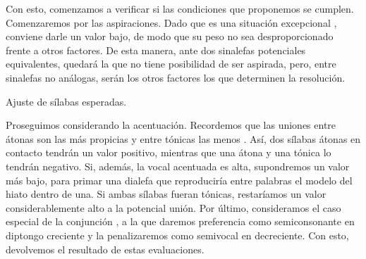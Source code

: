 Con esto, comenzamos a verificar si las condiciones que proponemos se cumplen. Comenzaremos por las aspiraciones. Dado que es una situación excepcional \parencite[50]{quilis2013}, conviene darle un valor bajo, de modo que su peso no sea desproporcionado frente a otros factores. De esta manera, ante dos sinalefas potenciales equivalentes, quedará la que no tiene posibilidad de ser aspirada, pero, entre sinalefas no análogas, serán los otros factores los que determinen la resolución.

\begin{algorithm}[!ht]
	\caption{Ajuste de sílabas esperadas.}\label{list:VerseMetre4}
\end{algorithm}

Proseguimos considerando la acentuación. Recordemos que las uniones entre átonas son las más propicias y entre tónicas las menos \parencite[138-139]{navarrotomas2004}. Así, dos sílabas átonas en contacto tendrán un valor positivo, mientras que una átona y una tónica lo tendrán negativo. Si, además, la vocal acentuada es alta, supondremos un valor más bajo, para primar una dialefa que reproduciría entre palabras el modelo del hiato dentro de una. Si ambas sílabas fueran tónicas, restaríamos un valor considerablemente alto a la potencial unión. Por último, consideramos el caso especial de la conjunción \parencites[59]{canellada1987}[49]{navarrotomas2004}, a la que daremos preferencia como semiconsonante en diptongo creciente y la penalizaremos como semivocal en decreciente. Con esto, devolvemos el resultado de estas evaluaciones.

